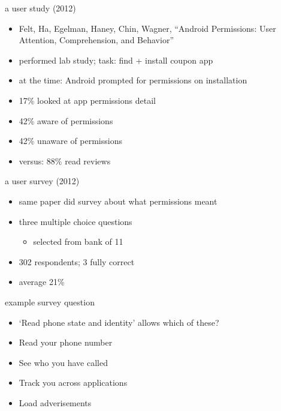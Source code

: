 \begin{frame}{a user study (2012)}
    \begin{itemize}
    \item Felt, Ha, Egelman, Haney, Chin, Wagner, ``Android Permissions: User Attention, Comprehension, and Behavior''
    \item performed lab study; task: find + install coupon app
    \item at the time: Android prompted for permissions on installation
    \vspace{.5cm}
    \item<2-> 17\% looked at app permissions detail
    \item<2-> 42\% aware of permissions
    \item<2-> 42\% unaware of permissions
    \vspace{.5cm}
    \item<2-> versus: 88\% read reviews 
    \end{itemize}
\end{frame}

\begin{frame}{a user survey (2012)}
    \begin{itemize}
    \item same paper did survey about what permissions meant
    \item three multiple choice questions 
        \begin{itemize}
        \item selected from bank of 11
        \end{itemize}
    \item 302 respondents; 3 fully correct
    \item average 21\%
    \end{itemize}
\end{frame}

\begin{frame}{example survey question}
    \begin{itemize}
    \item `Read phone state and identity' allows which of these?
    \vspace{.5cm}
    \item Read your phone number
    \item See who you have called
    \item Track you across applications
    \item Load adverisements
    \end{itemize}
\end{frame}

